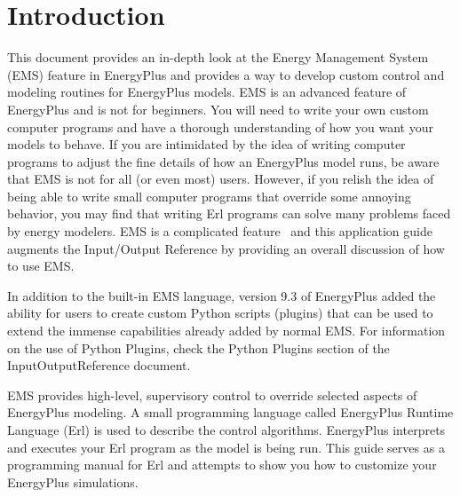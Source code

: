 

\chapter{Introduction}\label{introduction}

This document provides an in-depth look at the Energy Management System (EMS) feature in EnergyPlus and provides a way to develop custom control and modeling routines for EnergyPlus models. EMS is an advanced feature of EnergyPlus and is not for beginners. You will need to write your own custom computer programs and have a thorough understanding of how you want your models to behave. If you are intimidated by the idea of writing computer programs to adjust the fine details of how an EnergyPlus model runs, be aware that EMS is not for all (or even most) users. However, if you relish the idea of being able to write small computer programs that override some annoying behavior, you may find that writing Erl programs can solve many problems faced by energy modelers. EMS is a complicated feature~ and this application guide augments the Input/Output Reference by providing an overall discussion of how to use EMS.

In addition to the built-in EMS language, version 9.3 of EnergyPlus added the ability for users to create custom Python scripts (plugins) that can be used to extend the immense capabilities already added by normal EMS.  For information on the use of Python Plugins, check the Python Plugins section of the InputOutputReference document.

EMS provides high-level, supervisory control to override selected aspects of EnergyPlus modeling. A small programming language called EnergyPlus Runtime Language (Erl) is used to describe the control algorithms. EnergyPlus interprets and executes your Erl program as the model is being run. This guide serves as a programming manual for Erl and attempts to show you how to customize your EnergyPlus simulations.
